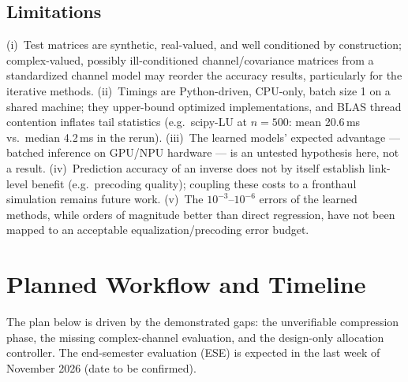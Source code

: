\documentclass[11pt,a4paper]{article}
\begin{document}
\subsection{Limitations}

(i)~Test matrices are synthetic, real-valued, and well conditioned by
construction; complex-valued, possibly ill-conditioned channel/covariance
matrices from a standardized channel model may reorder the accuracy results,
particularly for the iterative methods. (ii)~Timings are Python-driven,
CPU-only, batch size 1 on a shared machine; they upper-bound optimized
implementations, and BLAS thread contention inflates tail statistics
(e.g.\ scipy-LU at $n{=}500$: mean 20.6\,ms vs.\ median 4.2\,ms in the
rerun). (iii)~The learned models' expected advantage --- batched inference on
GPU/NPU hardware --- is an untested hypothesis here, not a result.
(iv)~Prediction accuracy of an inverse does not by itself establish
link-level benefit (e.g.\ precoding quality); coupling these costs to a
fronthaul simulation remains future work. (v)~The $10^{-3}$--$10^{-6}$ errors
of the learned methods, while orders of magnitude better than direct
regression, have not been mapped to an acceptable equalization/precoding
error budget.

\section{Planned Workflow and Timeline}
\label{sec:plan}

The plan below is driven by the demonstrated gaps: the unverifiable
compression phase, the missing complex-channel evaluation, and the
design-only allocation controller. The end-semester evaluation (ESE) is
expected in the last week of November 2026 (date to be confirmed).
\end{document}
